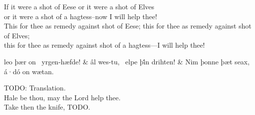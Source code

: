 \bvb If it were a shot of Eese or it were a shot of Elves \\
or it were a shot of a hagtess--now I will help thee! \\
This for thee as remedy against shot of Eese; this for thee as remedy against shot of Elves;  \\
this for thee as remedy against shot of a hagtess---I will help thee!\evb\evg


\bvg\bva%
leo þær on \hld\ yrgen-hæfde! &
âl wes-tu, \hld\ elpe þi̇́n drihten! &
Nim þonne þæt seax, á·dó on wætan.\eva

\bvb TODO: Translation. \\
Hale be thou, may the Lord help thee. \\
Take then the knife, TODO.\evb\evg

\sectionline
